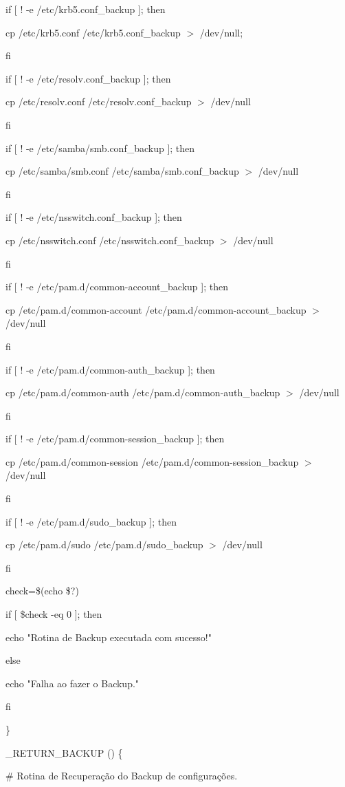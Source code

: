 	if [ ! -e /etc/krb5.conf\_backup ]; then

		cp /etc/krb5.conf /etc/krb5.conf\_backup $>$ /dev/null;

	fi

	if [ ! -e /etc/resolv.conf\_backup ]; then

		cp /etc/resolv.conf /etc/resolv.conf\_backup $>$ /dev/null

	fi

	if [ ! -e /etc/samba/smb.conf\_backup ]; then

        	cp /etc/samba/smb.conf /etc/samba/smb.conf\_backup $>$ /dev/null

	fi

	if [ ! -e /etc/nsswitch.conf\_backup ]; then

        	cp /etc/nsswitch.conf /etc/nsswitch.conf\_backup $>$ /dev/null

	fi

	if [ ! -e /etc/pam.d/common-account\_backup ]; then

	        cp /etc/pam.d/common-account /etc/pam.d/common-account\_backup $>$ /dev/null

	fi

	if [ ! -e /etc/pam.d/common-auth\_backup ]; then

	        cp /etc/pam.d/common-auth /etc/pam.d/common-auth\_backup $>$ /dev/null

	fi

	if [ ! -e /etc/pam.d/common-session\_backup ]; then

	        cp /etc/pam.d/common-session /etc/pam.d/common-session\_backup $>$ /dev/null

	fi

	if [ ! -e /etc/pam.d/sudo\_backup ]; then

	        cp /etc/pam.d/sudo /etc/pam.d/sudo\_backup $>$ /dev/null

	fi
         
        check=\$(echo \$?)

   if [ \$check -eq 0 ]; then

      echo "Rotina de Backup executada com sucesso!"

   else

      echo "Falha ao fazer o Backup."

   fi
         
\}

\_RETURN\_BACKUP () \{

        \# Rotina de Recuperação do Backup de configurações.

